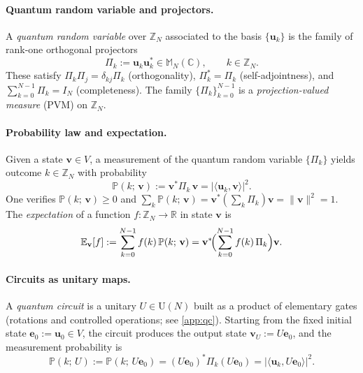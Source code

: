 \documentclass[12pt,a4paper]{article}
\theoremstyle{plain}
\theoremstyle{definition}
\theoremstyle{remark}
\begin{document}
\paragraph{Quantum random variable and projectors.}
A \emph{quantum random variable} over $\mathbb{Z}_N$ associated to the
basis $\{\mathbf{u}_k\}$ is the family of rank-one orthogonal projectors
\begin{equation}
  \Pi_k := \mathbf{u}_k \mathbf{u}_k^* \in \mathbb{M}_N(\mathbb{C}),
  \qquad k \in \mathbb{Z}_N.
  \label{eq:projectors}
\end{equation}
These satisfy $\Pi_k \Pi_j = \delta_{kj}\Pi_k$ (orthogonality),
$\Pi_k^* = \Pi_k$ (self-adjointness), and
$\sum_{k=0}^{N-1}\Pi_k = I_N$ (completeness).
The family $\{\Pi_k\}_{k=0}^{N-1}$ is a \emph{projection-valued measure}
(PVM) on $\mathbb{Z}_N$.

\paragraph{Probability law and expectation.}
Given a state $\mathbf{v} \in V$, a measurement of the quantum random
variable $\{\Pi_k\}$ yields outcome $k \in \mathbb{Z}_N$ with
probability
\begin{equation}
  \mathbb{P}(k;\, \mathbf{v})
  := \mathbf{v}^* \Pi_k\, \mathbf{v}
   = |\langle \mathbf{u}_k, \mathbf{v}\rangle|^2.
  \label{eq:born_linalg}
\end{equation}
One verifies $\mathbb{P}(k;\,\mathbf{v}) \geq 0$ and
$\sum_k \mathbb{P}(k;\,\mathbf{v}) = \mathbf{v}^* (\sum_k \Pi_k)\mathbf{v}
= \|\mathbf{v}\|^2 = 1$.
The \emph{expectation} of a function $f:\mathbb{Z}_N\to\mathbb{R}$
in state $\mathbf{v}$ is
\begin{equation}
  \mathbb{E}_{\mathbf{v}}[f]
  := \sum_{k=0}^{N-1} f(k)\,\mathbb{P}(k;\,\mathbf{v})
   = \mathbf{v}^* \!\Bigl(\sum_{k=0}^{N-1} f(k)\,\Pi_k\Bigr)\mathbf{v}.
  \label{eq:expectation_linalg}
\end{equation}

\paragraph{Circuits as unitary maps.}
A \emph{quantum circuit} is a unitary $U \in \mathrm{U}(N)$ built as
a product of elementary gates (rotations and controlled operations;
see \cref{app:qc}).
Starting from the fixed initial state $\mathbf{e}_0 := \mathbf{u}_0
\in V$, the circuit produces the output state
$\mathbf{v}_U := U\mathbf{e}_0$,
and the measurement probability is
\begin{equation}
  \mathbb{P}(k;\, U)
  := \mathbb{P}(k;\, U\mathbf{e}_0)
   = (U\mathbf{e}_0)^*\Pi_k(U\mathbf{e}_0)
   = |\langle \mathbf{u}_k, U\mathbf{e}_0\rangle|^2.
  \label{eq:circuit_prob}
\end{equation}
\end{document}
